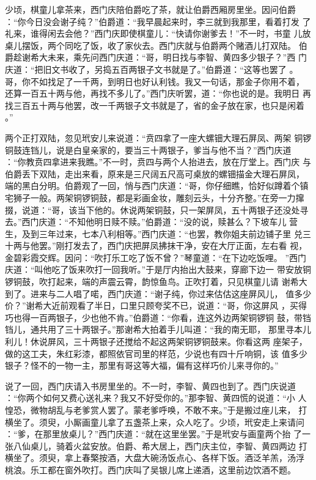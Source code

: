 少顷，棋童儿拿茶来，西门庆陪伯爵吃了茶，就让伯爵西厢房里坐。因问伯爵
：“你今日没会谢子纯？”伯爵道：“我早晨起来时，李三就到我那里，看着打发
了礼来，谁得闲去会他？”西门庆即使棋童儿：“快请你谢爹去！”不一时，书童
儿放桌儿摆饭，两个同吃了饭，收了家伙去。西门庆就与伯爵两个赌酒儿打双陆。
伯爵趁谢希大未来，乘先问西门庆道：“哥，明日找与李智、黄四多少银子？”西
门庆道：“把旧文书收了，另捣五百两银子文书就是了。”伯爵道：“这等也罢了
。哥，你不如找足了一千两，到明日也好认利钱。我又一句话，那金子你用不着，
还算一百五十两与他，再找不多儿了。”西门庆听罢，道：“你也说的是。我明日
再找三百五十两与他罢，改一千两银子文书就是了，省的金子放在家，也只是闲着
。”

两个正打双陆，忽见玳安儿来说道：“贲四拿了一座大螺钿大理石屏凤、两架
铜锣铜鼓连铛儿，说是白皇亲家的，要当三十两银子，爹当与他不当？”西门庆道
：“你教贲四拿进来我瞧。”不一时，贲四与两个人抬进去，放在厅堂上。西门庆
与伯爵丢下双陆，走出来看，原来是三尺阔五尺高可桌放的螺钿描金大理石屏凤，
端的黑白分明。伯爵观了一回，悄与西门庆道：“哥，你仔细瞧，恰好似蹲着个镇
宅狮子一般。两架铜锣铜鼓，都是彩画金妆，雕刻云头，十分齐整。”在旁一力撺
掇，说道：“哥，该当下他的。休说两架铜鼓，只一架屏凤，五十两银子还没处寻
去。”西门庆道：“不知他明日赎不赎。”伯爵道：“没的说，赎甚么？下坡车儿
营生，及到三年过来，七本八利相等。”西门庆道：“也罢，教你姐夫前边铺子里
兑三十两与他罢。”刚打发去了，西门庆把屏凤拂抹干净，安在大厅正面，左右看
视，金碧彩霞交辉。因问：“吹打乐工吃了饭不曾？”琴童道：“在下边吃饭哩。
”西门庆道：“叫他吃了饭来吹打一回我听。”于是厅内抬出大鼓来，穿廊下边一
带安放铜锣铜鼓，吹打起来，端的声震云霄，韵惊鱼鸟。正吹打着，只见棋童儿请
谢希大到了。进来与二人唱了喏，西门庆道：“谢子纯，你过来估估这座屏风儿，
值多少价？”谢希大近前观看了半日，口里只顾夸奖不已，说道：“哥，你这屏风
，买得巧也得一百两银子，少也他不肯。”伯爵道：“你看，连这外边两架铜锣铜
鼓，带铛铛儿，通共用了三十两银子。”那谢希大拍着手儿叫道：“我的南无耶，
那里寻本儿利儿！休说屏风，三十两银子还搅给不起这两架铜锣铜鼓来。你看这两
座架子，做的这工夫，朱红彩漆，都照依官司里的样范，少说也有四十斤响铜，该
值多少银子？怪不的一物一主，那里有哥这等大福，偏有这样巧价儿来寻你的。”

说了一回，西门庆请入书房里坐的。不一时，李智、黄四也到了。西门庆说道
：“你两个如何又费心送礼来？我又不好受你的。”那李智、黄四慌的说道：“小
人惶恐，微物胡乱与老爹赏人罢了。蒙老爹呼唤，不敢不来。”于是搬过座儿来，
打横坐了。须臾，小厮画童儿拿了五盏茶上来，众人吃了。少顷，玳安走上来请问
：“爹，在那里放桌儿？”西门庆道：“就在这里坐罢。”于是玳安与画童两个抬
了一张八仙桌儿，骑着火盆安放。伯爵、希大居上，西门庆主位，李智、黄四两边
打横坐了。须臾，拿上春檠按酒，大盘大碗汤饭点心、各样下饭。酒泛羊羔，汤浮
桃浪。乐工都在窗外吹打。西门庆叫了吴银儿席上递酒，这里前边饮酒不题。

